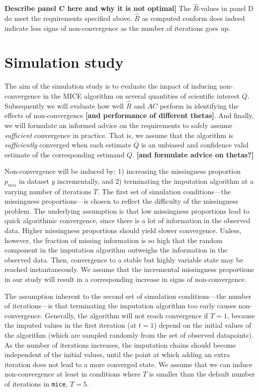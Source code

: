 \documentclass[Royal,times,sageh]{sagej}
\begin{document}
\textbf{Describe panel C here and why it is not optimal{]}} The \(\widehat{R}\)-values in panel D do meet the requirements specified above. \(\widehat{R}\) as computed conform \citet{veht19} does indeed indicate less signs of non-convergence as the number of iterations goes up. \textbf{\citep[explain the dip in Rhat values at t=2. Namely, because we can only use 2 of the 3 tricks by][ if the number of iterations is very low (t\textless4). That's why the \(\widehat{R}\)s are more similar to the traditional GR.]{veht19}}

\hypertarget{simulation-study}{%
\section{Simulation study}\label{simulation-study}}

The aim of the simulation study is to evaluate the impact of inducing non-convergence in the MICE algorithm on several quantities of scientific interest \(Q\). Subsequently we will evaluate how well \(\widehat{R}\) and \(AC\) perform in identifying the effects of non-convergence \textbf{{[}and performance of different thetas{]}}. And finally, we will formulate an informed advice on the requirements to safely assume \emph{sufficient} convergence in practice. That is, we assume that the algorithm is \emph{sufficiently} converged when each estimate \(\bar{Q}\) is an unbiased and confidence valid estimate of the corresponding estimand \(Q\). \textbf{{[}and formulate advice on thetas?{]}}

Non-convergence will be induced by: 1) increasing the missingness proportion \(p_{mis}\) in dataset \(y\) incrementally, and 2) terminating the imputation algorithm at a varying number of iterations \(T\). The first set of simulation conditions---the missingness proportions---is chosen to reflect the difficulty of the missingness problem. The underlying assumption is that low missingness proportions lead to quick algorithmic convergence, since there is a lot of information in the observed data. Higher missingness proportions should yield slower convergence. Unless, however, the fraction of missing information is so high that the random component in the imputation algorithm outweighs the information in the observed data. Then, convergence to a stable but highly variable state may be reached instantaneously. We assume that the incremental missingness proportions in our study will result in a corresponding increase in signs of non-convergence.

The assumption inherent to the second set of simulation conditions---the number of iterations---is that terminating the imputation algorithm too early causes non-convergence. Generally, the algorithm will not reach convergence if \(T=1\), because the imputed values in the first iteration (at \(t=1\)) depend on the initial values of the algorithm (which are sampled randomly from the set of observed datapoints). As the number of iterations increases, the imputation chains should become independent of the initial values, until the point at which adding an extra iteration does not lead to a more converged state. We assume that we can induce non-convergence at least in conditions where \(T\) is smaller than the default number of iterations in \texttt{mice}, \(T=5\).
\end{document}
